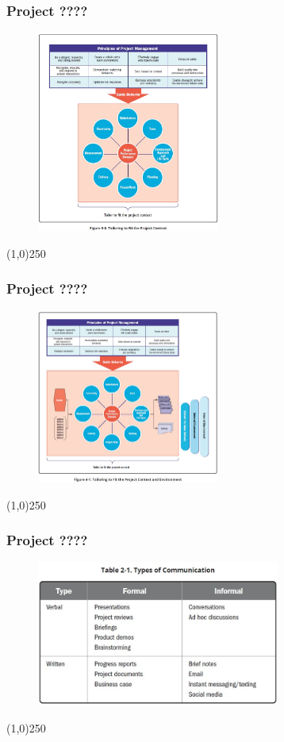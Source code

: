 \begin{frame}
\frametitle{Project ????}
 \begin{figure}
    \centering
        \includegraphics[width = 6cm]{../images/guide/Fig3-8.jpg}
    \label{guidefig:3-8}
 \end{figure}
\end{frame}
\begin{center}\line(1,0){250}\end{center}


\begin{frame}
\frametitle{Project ????}
 \begin{figure}
    \centering
        \includegraphics[width = 6cm]{../images/guide/Fig4-1.jpg}
    \label{guidefig:4-1}
 \end{figure}
\end{frame}
\begin{center}\line(1,0){250}\end{center}






\begin{frame}
\frametitle{Project ????}
 \begin{figure}
    \centering
        \includegraphics[width = 8cm]{../images/guide/Table2-1.jpg}
    \label{guideTable:2-1}
 \end{figure}
\end{frame}
\begin{center}\line(1,0){250}\end{center}


